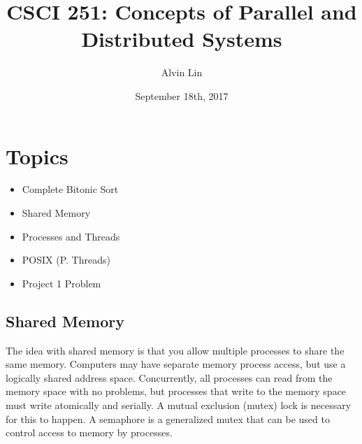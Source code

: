 \documentclass{math}
\title{CSCI 251: Concepts of Parallel and Distributed Systems}
\author{Alvin Lin}
\date{September 18th, 2017}
\begin{document}
\maketitle

\section*{Topics}
\begin{itemize}
  \item Complete Bitonic Sort
  \item Shared Memory
  \item Processes and Threads
  \item POSIX (P. Threads)
  \item Project 1 Problem
\end{itemize}

\subsection*{Shared Memory}
The idea with shared memory is that you allow multiple processes to share the
same memory. Computers may have separate memory process access, but use
a logically shared address space. Concurrently, all processes can read from the
memory space with no problems, but processes that write to the memory space must
write atomically and serially. A mutual exclusion (mutex) lock is necessary for
this to happen. A semaphore is a generalized mutex that can be used to control
access to memory by processes.
\end{document}
